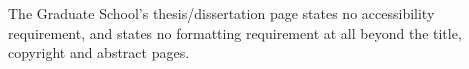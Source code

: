 %
%
%
%


	{The Graduate School's thesis/dissertation page states no accessibility
	 requirement, and states no formatting requirement at all beyond the title,
	 copyright and abstract pages.}

\thesisnoapprovalpage
